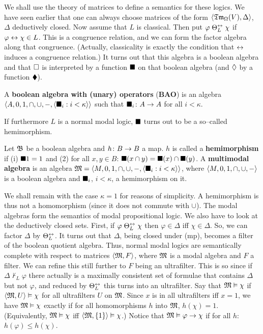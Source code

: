 We shall use the theory of matrices to define a semantics for
these logics. We have seen earlier that one can always choose
matrices of the form $\langle \mathfrak{Tm}_{\Omega}(V), \Delta\rangle$,
$\Delta$ deductively closed. Now assume that $L$ is
classical. Then put $\varphi\; \Theta_L^{\leftrightarrow}\; \chi$ if $\varphi \leftrightarrow
\chi \in L$. This is a congruence relation, and we can form
the factor algebra along that congruence. (Actually, classicality
is exactly the condition that $\leftrightarrow$ induces a congruence
relation.) It turns out that this algebra is a boolean algebra and
that $\square$ is interpreted by a
\index{$\sq$, $\wD$}%
function $\sq$ on that boolean algebra (and $\wD$ by a function
$\blacklozenge$).
\begin{defn}
A \textbf{boolean algebra with (unary) operators} (\textbf{BAO}) is an
algebra $\langle A, 0, 1, \cap, \cup, -, \langle \blacksquare_i : i < \kappa\rangle\rangle$
such that $\blacksquare_i \colon A \rightarrow A$ for all $i < \kappa$.
\end{defn}
If furthermore $L$ is a normal modal logic, $\sq$ turns
out to be a so--called hemimorphism.
\begin{defn}
Let $\mathfrak{B}$ be a boolean algebra and $h \colon B \rightarrow B$ a map. $h$ is called
a \textbf{hemimorphism} if (i) $\blacksquare 1 = 1$ and (2) for all $x, y \in B$:
$\blacksquare (x \cap y) = \blacksquare (x) \cap \blacksquare (y)$. A \textbf{multimodal algebra} is
an algebra $\mathfrak{M} = \langle M, 0, 1, \cap, \cup, -, \langle \blacksquare_i :
i < \kappa\rangle\rangle$, where $\langle M, 0, 1, \cap, \cup, -\rangle$ is
a boolean algebra and $\blacksquare_i$, $i < \kappa$, a hemimorphism on it.
\end{defn}
We shall remain with the case $\kappa = 1$ for reasons of
simplicity. A hemimorphism is thus not a homomorphism (since it
does not commute with $\cup$). The modal algebras form the
semantics of modal propositional logic. We also have to look at
the deductively closed sets. First, if 
$\varphi\; \Theta_L^{\leftrightarrow}\; \chi$ then $\varphi \in %
\Delta$ iff $\chi \in \Delta$. So, we can factor
$\Delta$ by $\Theta_L^{\leftrightarrow}$. It turns out that $\Delta$, being closed
under (mp), becomes a filter of the boolean quotient algebra.
Thus, normal modal logics are semantically complete with
respect to matrices $\langle \mathfrak{M}, F\rangle$, where $\mathfrak{M}$ is a modal
algebra and $F$ a filter. We can refine this still further to $F$
being an ultrafilter. This is so since if $\Delta \nvdash_{L}
\varphi$ there actually is a maximally consistent set of formulae
that contains $\Delta$ but not $\varphi$, and reduced by $\Theta_L^{\leftrightarrow}$
this turns into an ultrafilter. Say that $\mathfrak{M} \vDash \chi$ if
$\langle \mathfrak{M}, U\rangle \vDash \chi$ for all ultrafilters $U$ on $\mathfrak{M}$.
Since $x$ is in all ultrafilters iff $x = 1$, we have
$\mathfrak{M} \vDash \chi$ exactly if for all homomorphisms $h$ into $\mathfrak{M}$,
$h(\chi) = 1$. (Equivalently, $\mathfrak{M} \vDash \chi$ iff
$\langle \mathfrak{M}, \{1\}\rangle \vDash \chi$.) Notice that $\mathfrak{M} \vDash \varphi
\rightarrow \chi$ if for all $h$: $h(\varphi) \leq h(\chi)$.

